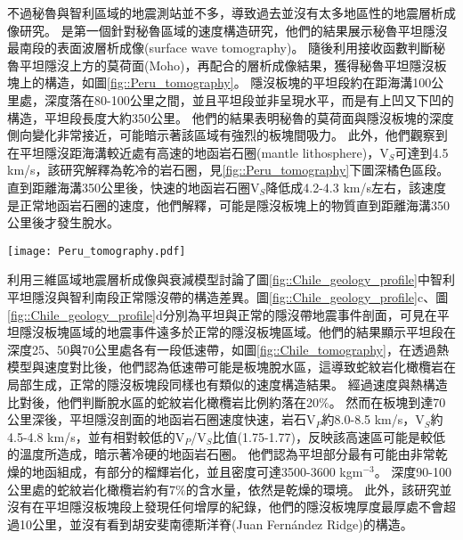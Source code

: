 不過秘魯與智利區域的地震測站並不多，導致過去並沒有太多地區性的地震層析成像研究。
\citet{Ma2014}是第一個針對秘魯區域的速度構造研究，他們的結果展示秘魯平坦隱沒最南段的表面波層析成像(surface wave tomography)。
隨後\citet{Ma2015}利用接收函數判斷秘魯平坦隱沒上方的莫荷面(Moho)，再配合\citet{Ma2014}的層析成像結果，獲得秘魯平坦隱沒板塊上的構造，如圖\ref{fig::Peru_tomography}。
隱沒板塊的平坦段約在距海溝100公里處，深度落在80-100公里之間，並且平坦段並非呈現水平，而是有上凹又下凹的構造，平坦段長度大約350公里。
他們的結果表明秘魯的莫荷面與隱沒板塊的深度側向變化非常接近，可能暗示著該區域有強烈的板塊間吸力。
此外，他們觀察到在平坦隱沒距海溝較近處有高速的地函岩石圈(mantle lithosphere)，V$_S$可達到4.5 km/s，該研究解釋為乾冷的岩石圈，見\ref{fig::Peru_tomography}下圖深橘色區段。
直到距離海溝350公里後，快速的地函岩石圈V$_S$降低成4.2-4.3 km/s左右，該速度是正常地函岩石圈的速度，他們解釋，可能是隱沒板塊上的物質直到距離海溝350公里後才發生脫水。

\begin{figure*}[htp]
    \centering
    \texttt{[image: Peru\_tomography.pdf]}
    \caption[秘魯平坦隱沒南段地震學研究結果與解釋圖，摘自\citet{Ma2015}]{秘魯平坦隱沒南段地震學研究結果與解釋圖，摘自\citet{Ma2015}。(a)深度80公里的V$_{SV}$速度構造，來自\citet{Ma2014}。圖中左上方標示高速地函岩石圈與正常地函岩石圈的分界。紅色虛線標示出於20公里深的低速帶範圍，該低速帶被解釋為熔融區。粉紅色線為板塊等深度線。紅色實線為圖(C)中AA'剖面位置。灰色點為該研究所使用的側站位置。(b)板塊等深度圖，各顏色點為接收函數轉換波的地殼入射點，顏色代表不同深度。灰色點為該研究所使用的側站位置。(c)最上圖為AA'剖面地形，中圖為AA'剖面V$_{SV}$速度構造圖，白色點與紅色點分別為接收函數於西北地震事件群與東南地震事件群所獲得之板塊深度。最下方為AA'剖面結構卡通圖，大陸與海洋莫荷面深度來自圖(b)中的結果。
    }
    \label{fig::Peru_tomography}
\end{figure*}

\citet{Marot2014}利用三維區域地震層析成像與衰減模型討論了圖\ref{fig::Chile_geology_profile}中智利平坦隱沒與智利南段正常隱沒帶的構造差異。圖\ref{fig::Chile_geology_profile}c、圖\ref{fig::Chile_geology_profile}d分別為平坦與正常的隱沒帶地震事件剖面，可見在平坦隱沒板塊區域的地震事件遠多於正常的隱沒板塊區域。他們的結果顯示平坦段在深度25、50與70公里處各有一段低速帶，如圖\ref{fig::Chile_tomography}，在透過熱模型與速度對比後，他們認為低速帶可能是板塊脫水區，這導致蛇紋岩化橄欖岩在局部生成，正常的隱沒板塊段同樣也有類似的速度構造結果。
經過速度與熱構造比對後，他們判斷脫水區的蛇紋岩化橄欖岩比例約落在20$\%$。
然而在板塊到達70公里深後，平坦隱沒剖面的地函岩石圈速度快速，岩石V$_P$約8.0-8.5 km/s，V$_S$約4.5-4.8 km/s，並有相對較低的V$_P$/V$_S$比值(1.75-1.77)，反映該高速區可能是較低的溫度所造成，暗示著冷硬的地函岩石圈。
他們認為平坦部分最有可能由非常乾燥的地函組成，有部分的榴輝岩化，並且密度可達3500-3600 kgm$^{-3}$。
深度90-100公里處的蛇紋岩化橄欖岩約有7$\%$的含水量，依然是乾燥的環境。
此外，該研究並沒有在平坦隱沒板塊段上發現任何增厚的紀錄，他們的隱沒板塊厚度最厚處不會超過10公里，並沒有看到胡安斐南德斯洋脊(Juan Fernández Ridge)的構造。

